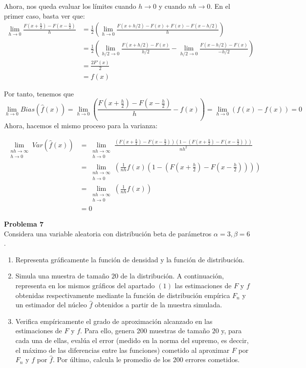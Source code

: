 \documentclass[11pt]{article}
\newenvironment{problem}[2][Problema]
    { \begin{mdframed}[backgroundcolor=gray!20] \textbf{#1 #2} \\}
    {  \end{mdframed}}
\begin{document}
Ahora, nos queda evaluar los límites cuando \(h\to 0\) y cuando
\(nh\to 0\). En el primer caso, basta ver que: \begin{align*}
\lim_{h\to 0}  \frac{F(x + \frac{h}{2}) - F(x -\frac{h}{2})}{h}& = \frac{1}{2}\left(\lim_{h\to 0} \frac{F(x+h/2) - F(x) + F(x) - F(x-h/2)}{h}\right) \\
 & = \frac{1}{2}\left(\lim_{h/2\to 0}\frac{F(x+h/2) - F(x)}{h/2} - \lim_{h/2\to 0}\frac{F(x-h/2) - F(x)}{-h/2}\right)\\
&= \frac{2 F'(x)}{2}\\
& = f(x)
\end{align*}

Por tanto, tenemos que \[
\lim_{h\to 0} Bias(\hat{f}(x)) =  \lim_{h\to 0}\left(\frac{F(x + \frac{h}{2}) - F(x -\frac{h}{2})}{h} - f(x)\right) = \lim_{h\to 0} \left(f(x) - f(x)\right) = 0
\] Ahora, hacemos el mismo proceso para la varianza:

\begin{align*}
\lim_{\substack{nh \to \infty \\ h \to 0}} Var(\hat{f}(x))  &= \lim_{\substack{nh \to \infty \\ h \to 0}}\frac{ \left(F\left(x + \frac{h}{2}\right) - F\left(x -\frac{h}{2}\right)\right)  \left(1 - \left(F(x + \frac{h}{2}) - F(x -\frac{h}{2})\right)\right)}{n h^2} \\
& = \lim_{\substack{nh \to \infty \\ h \to 0}} \left( \frac{1}{nh} f(x)\left(1 - \left(F(x + \frac{h}{2}) - F(x -\frac{h}{2})\right)\right)\right)\\
& =  \lim_{\substack{nh \to \infty \\ h \to 0}} \left( \frac{1}{nh} f(x)\right)\\
& = 0
\end{align*}

\begin{problem}{7}
    Considera una variable aleatoria con distribución beta de parámetros $\alpha = 3,\beta=6$.
    \begin{enumerate}
\item Representa gráficamente la función de densidad y la función de distribución.
\item Simula una muestra de tamaño $20$ de la distribución. A continuación, representa en los mismos gráficos del apartado $(1)$ las estimaciones de $F$ y $f$ obtenidas respectivamente mediante la función de distribución empírica $F_n$ y un estimador del núcleo $\hat f$ obtenidos a partir de la muestra simulada.
\item Verifica empíricamente el grado de aproximación alcanzado en las estimaciones de $F$ y $f$. Para ello, genera 200 muestras de tamaño $20$ y, para cada una de ellas, evalúa el error (medido en la norma del supremo, es deccir, el máximo de las diferencias entre las funciones) cometido al aproximar $F$ por $F_n$ y $f$ por $\hat f$. Por último, calcula le promedio de los $200$ errores cometidos.
    \end{enumerate}

\end{problem}
\end{document}
